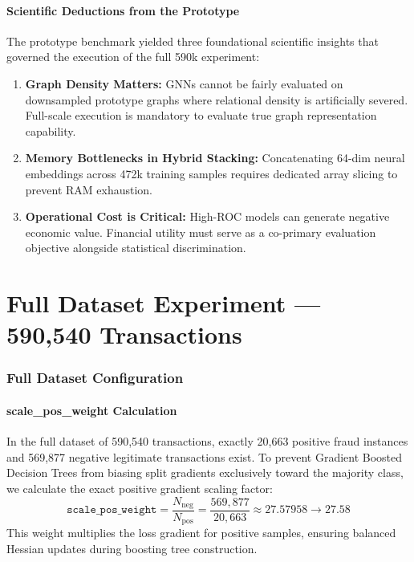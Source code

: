 \documentclass[11pt,a4paper]{report}
\begin{document}
\subsection{Scientific Deductions from the Prototype}
The prototype benchmark yielded three foundational scientific insights that governed the execution of the full 590k experiment:
\begin{enumerate}
    \item \textbf{Graph Density Matters:} GNNs cannot be fairly evaluated on downsampled prototype graphs where relational density is artificially severed. Full-scale execution is mandatory to evaluate true graph representation capability.
    \item \textbf{Memory Bottlenecks in Hybrid Stacking:} Concatenating 64-dim neural embeddings across 472k training samples requires dedicated array slicing to prevent RAM exhaustion.
    \item \textbf{Operational Cost is Critical:} High-ROC models can generate negative economic value. Financial utility must serve as a co-primary evaluation objective alongside statistical discrimination.
\end{enumerate}

\part{Full Dataset Experiment --- 590,540 Transactions}

\section{Full Dataset Configuration}

\subsection{scale\_pos\_weight Calculation}
In the full dataset of 590,540 transactions, exactly 20,663 positive fraud instances and 569,877 negative legitimate transactions exist. To prevent Gradient Boosted Decision Trees from biasing split gradients exclusively toward the majority class, we calculate the exact positive gradient scaling factor:
\begin{equation}
\texttt{scale\_pos\_weight} = \frac{N_{\text{neg}}}{N_{\text{pos}}} = \frac{569{,}877}{20{,}663} \approx 27.57958 \rightarrow 27.58
\end{equation}
This weight multiplies the loss gradient for positive samples, ensuring balanced Hessian updates during boosting tree construction.
\end{document}
